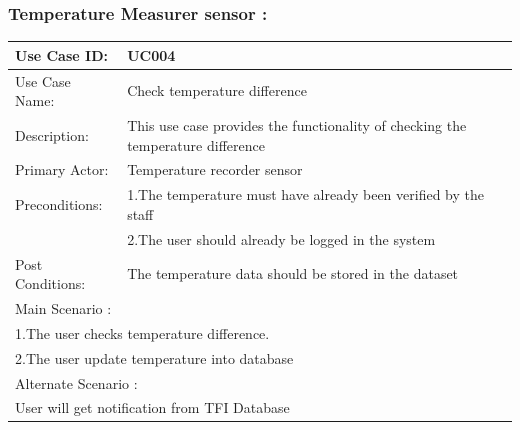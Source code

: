		\subsubsection{Temperature Measurer sensor :}
				\begin{center}
				\vspace*{1\baselineskip}	
				\begin{tabular}{|l|p{10cm}|}
					\hline
					Use Case ID: & UC004 \\
					\hline
					Use Case Name: & Check temperature difference \\
					\hline
					Description: & This use case provides the functionality of checking the temperature difference \\
					\hline
					Primary Actor: & Temperature recorder sensor \\
					\hline
					Preconditions: & 1.The temperature must have already been verified by the staff\\ 
					& 2.The user should already be logged in the system \\
					\hline
					Post Conditions: & The temperature data should be stored in the dataset\\
					\hline
					\multicolumn{2}{|l|}{Main Scenario :} \\
					\hline
					\multicolumn{2}{|l|}{1.The user checks temperature difference.} \\
					\multicolumn{2}{|l|}{2.The user update temperature into database} \\
					\hline
					\multicolumn{2}{|l|}{Alternate Scenario :} \\
					\hline
					\multicolumn{2}{|l|}{User will get notification from TFI Database} \\
					\hline
				\end{tabular}
				\end{center}
				
				
				
		\newpage
